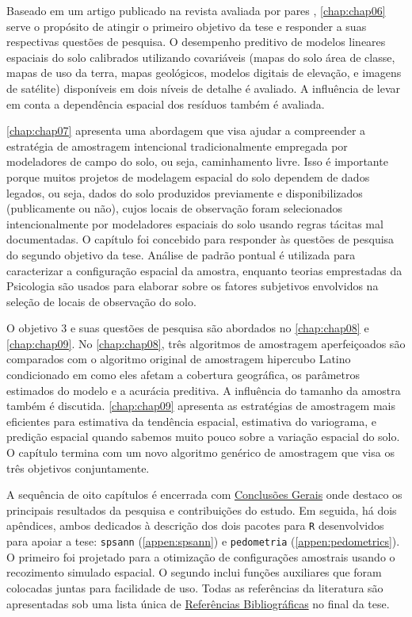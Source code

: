 Baseado em um artigo publicado na revista avaliada por pares \geoderma, \autoref{chap:chap06} serve o 
propósito de atingir o primeiro objetivo da tese e responder a suas respectivas questões de pesquisa. O 
desempenho preditivo de modelos lineares espaciais do solo calibrados utilizando covariáveis (mapas do solo 
área de classe, mapas de uso da terra, mapas geológicos, modelos digitais de elevação, e imagens de satélite) 
disponíveis em dois níveis de detalhe é avaliado. A influência de levar em conta a dependência espacial dos 
resíduos também é avaliada.

\autoref{chap:chap07} apresenta uma abordagem que visa ajudar a compreender a estratégia de amostragem 
intencional tradicionalmente empregada por modeladores de campo do solo, ou seja, caminhamento livre. Isso é 
importante porque muitos projetos de modelagem espacial do solo dependem de dados legados, ou seja, dados do 
solo produzidos previamente e disponibilizados (publicamente ou não), cujos locais de observação foram 
selecionados intencionalmente por modeladores espaciais do solo usando regras tácitas mal documentadas. O 
capítulo foi concebido para responder às questões de pesquisa do segundo objetivo da tese. Análise de padrão 
pontual é utilizada para caracterizar a configuração espacial da amostra, enquanto teorias emprestadas da 
Psicologia são usados para elaborar sobre os fatores subjetivos envolvidos na seleção de locais de observação 
do solo.

O objetivo 3 e suas questões de pesquisa são abordados no \autoref{chap:chap08} e \autoref{chap:chap09}. No 
\autoref{chap:chap08}, três algoritmos de amostragem aperfeiçoados são comparados com o algoritmo original de 
amostragem hipercubo Latino condicionado em como eles afetam a cobertura geográfica, os parâmetros estimados 
do modelo e a acurácia preditiva. A influência do tamanho da amostra também é discutida. \autoref{chap:chap09} 
apresenta as estratégias de amostragem mais eficientes para estimativa da tendência espacial, estimativa do 
variograma, e predição espacial quando sabemos muito pouco sobre a variação espacial do solo. O capítulo 
termina com um novo algoritmo genérico de amostragem que visa os três objetivos conjuntamente.

A sequência de oito capítulos é encerrada com \hyperref[chap:chap10]{Conclusões Gerais} onde destaco os 
principais resultados da pesquisa e contribuições do estudo. Em seguida, há dois apêndices, ambos dedicados à 
descrição dos dois pacotes para \texttt{R} desenvolvidos para apoiar a tese: \texttt{spsann} 
(\autoref{appen:spsann}) e \texttt{pedometria} (\autoref{appen:pedometrics}). O primeiro foi projetado para a 
otimização de configurações amostrais usando o recozimento simulado espacial. O segundo inclui funções 
auxiliares que foram colocadas juntas para facilidade de uso. Todas as referências da literatura são 
apresentadas sob uma lista única de \hyperref[chap:references]{Referências Bibliográficas} no final da tese.

